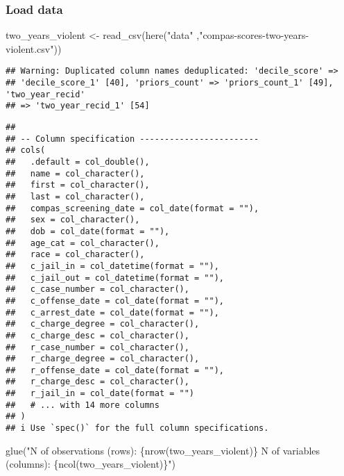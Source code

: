 \documentclass[
]{book}
\newenvironment{Shaded}{\begin{snugshade}}{\end{snugshade}}
\newcommand{\FunctionTok}[1]{\textcolor[rgb]{0.00,0.00,0.00}{#1}}
\newcommand{\NormalTok}[1]{#1}
\newcommand{\OtherTok}[1]{\textcolor[rgb]{0.56,0.35,0.01}{#1}}
\newcommand{\StringTok}[1]{\textcolor[rgb]{0.31,0.60,0.02}{#1}}
\begin{document}
\hypertarget{load-data-1}{%
\subsubsection{Load data}\label{load-data-1}}

\begin{Shaded}
\begin{Highlighting}[]
\NormalTok{two\_years\_violent }\OtherTok{\textless{}{-}} \FunctionTok{read\_csv}\NormalTok{(}\FunctionTok{here}\NormalTok{(}\StringTok{"data"}\NormalTok{ ,}\StringTok{"compas{-}scores{-}two{-}years{-}violent.csv"}\NormalTok{))}
\end{Highlighting}
\end{Shaded}

\begin{verbatim}
## Warning: Duplicated column names deduplicated: 'decile_score' =>
## 'decile_score_1' [40], 'priors_count' => 'priors_count_1' [49], 'two_year_recid'
## => 'two_year_recid_1' [54]
\end{verbatim}

\begin{verbatim}
## 
## -- Column specification ------------------------
## cols(
##   .default = col_double(),
##   name = col_character(),
##   first = col_character(),
##   last = col_character(),
##   compas_screening_date = col_date(format = ""),
##   sex = col_character(),
##   dob = col_date(format = ""),
##   age_cat = col_character(),
##   race = col_character(),
##   c_jail_in = col_datetime(format = ""),
##   c_jail_out = col_datetime(format = ""),
##   c_case_number = col_character(),
##   c_offense_date = col_date(format = ""),
##   c_arrest_date = col_date(format = ""),
##   c_charge_degree = col_character(),
##   c_charge_desc = col_character(),
##   r_case_number = col_character(),
##   r_charge_degree = col_character(),
##   r_offense_date = col_date(format = ""),
##   r_charge_desc = col_character(),
##   r_jail_in = col_date(format = "")
##   # ... with 14 more columns
## )
## i Use `spec()` for the full column specifications.
\end{verbatim}

\begin{Shaded}
\begin{Highlighting}[]
\FunctionTok{glue}\NormalTok{(}\StringTok{"N of observations (rows): \{nrow(two\_years\_violent)\}}
\StringTok{      N of variables (columns): \{ncol(two\_years\_violent)\}"}\NormalTok{)}
\end{Highlighting}
\end{Shaded}
\end{document}
